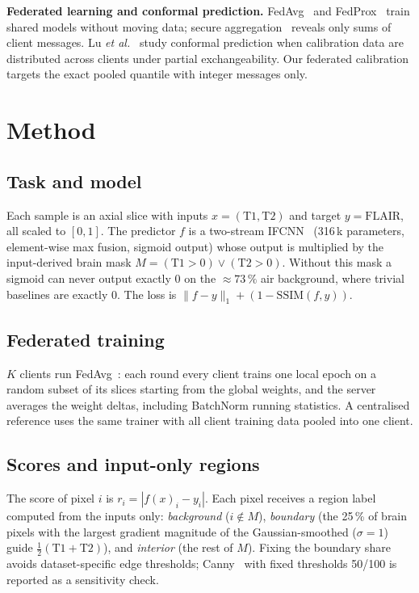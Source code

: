 \documentclass[conference]{IEEEtran}
\begin{document}
\noindent\textbf{Federated learning and conformal prediction.} FedAvg~\cite{mcmahan2017fedavg} and FedProx~\cite{li2020fedprox} train shared models without moving data; secure aggregation~\cite{bonawitz2017secagg} reveals only sums of client messages. Lu \textit{et al.}~\cite{lu2023fedcp} study conformal prediction when calibration data are distributed across clients under partial exchangeability. Our federated calibration targets the exact pooled quantile with integer messages only.

\section{Method}
\label{sec:method}

\subsection{Task and model}
Each sample is an axial slice with inputs $x=(\text{T1},\text{T2})$ and target $y=\text{FLAIR}$, all scaled to $[0,1]$. The predictor $f$ is a two-stream IFCNN~\cite{zhang2021ifcnn} (316\,k parameters, element-wise max fusion, sigmoid output) whose output is multiplied by the input-derived brain mask $M=(\text{T1}>0)\lor(\text{T2}>0)$. Without this mask a sigmoid can never output exactly 0 on the $\approx 73\,\%$ air background, where trivial baselines are exactly 0. The loss is $\|f-y\|_1 + (1-\text{SSIM}(f,y))$.

\subsection{Federated training}
$K$ clients run FedAvg~\cite{mcmahan2017fedavg}: each round every client trains one local epoch on a random subset of its slices starting from the global weights, and the server averages the weight deltas, including BatchNorm running statistics. A centralised reference uses the same trainer with all client training data pooled into one client.

\subsection{Scores and input-only regions}
The score of pixel $i$ is $r_i=|f(x)_i-y_i|$. Each pixel receives a region label computed from the inputs only: \emph{background} ($i\notin M$), \emph{boundary} (the 25\,\% of brain pixels with the largest gradient magnitude of the Gaussian-smoothed ($\sigma{=}1$) guide $\tfrac12(\text{T1}+\text{T2})$), and \emph{interior} (the rest of $M$). Fixing the boundary share avoids dataset-specific edge thresholds; Canny~\cite{canny1986edge} with fixed thresholds 50/100 is reported as a sensitivity check.
\end{document}
